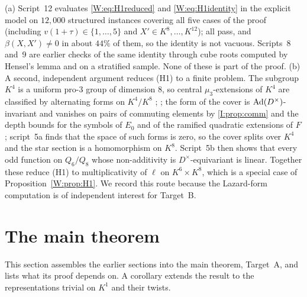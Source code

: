 \begin{remark}\label{W:rem:H1-checks}
(a) Script~12 evaluates \eqref{W:eq:H1reduced} and \eqref{W:eq:H1identity}
in the explicit model on $12{,}000$ structured instances covering all
five cases of the proof (including $v(1+\tau)\in\{1,\dots,5\}$ and
$X'\in K^8,\dots,K^{12}$); all pass, and $\beta(X,X')\ne0$ in about
$44\%$ of them, so the identity is not vacuous.  Scripts~8 and~9 are
earlier checks of the same identity through cube roots computed by
Hensel's lemma and on a stratified sample.  None of these is part of
the proof.
(b) A second, independent argument reduces (H1) to a finite problem.
The subgroup $K^4$ is a uniform pro-$3$ group of dimension $8$, so
central $\mu_3$-extensions of $K^4$ are classified by alternating forms
on $K^4/K^8$ \cite[Ch.~V]{Laz65}; \cite[\S5]{SW00}; the form of the cover is
$\operatorname{Ad}(D^\times)$-invariant and vanishes on pairs of commuting elements by
\cref{I:prop:comm} and the depth bounds for the symbols of
$E_0$ and of the ramified quadratic extensions of $F$; script~5a finds
that the space of such forms is zero, so the cover splits over $K^4$
and the star section is a homomorphism on $K^8$.  Script~5b then shows
that every odd function on $Q_6/Q_8$ whose non-additivity is
$D^\times$-equivariant is linear.  Together these reduce (H1) to
multiplicativity of $\ell$ on $K^6\times K^8$, which is a special case
of Proposition~\ref{W:prop:H1}.  We record this route because the
Lazard-form computation is of independent interest for Target~B.
\end{remark}

\section{The main theorem}\label{W:sec:maintheorem}
This section assembles the earlier sections into the main theorem, Target~A, and lists what its proof depends on. A corollary extends the result to the representations trivial on $K^1$ and their twists.

